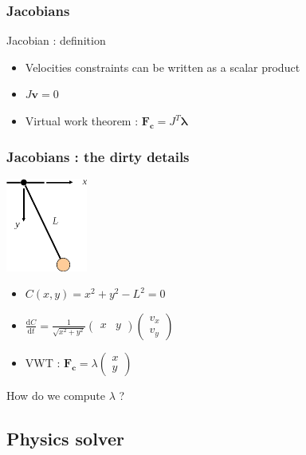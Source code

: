 \documentclass{beamer}
\begin{document}
\begin{frame}
 \frametitle{Jacobians}
 \begin{block}{Jacobian : definition}
 \begin{itemize}
  \item Velocities constraints can be written as a scalar product
  \item $J\mathbf{v} = 0$
  \pause
  \item Virtual work theorem : $\mathbf{F_c} = J^T \mathbf{\lambda}$
  \end{itemize}
  \end{block}
\end{frame}

\begin{frame}
 \frametitle{Jacobians : the dirty details}
  \begin{center}\includegraphics[width = 0.2\textwidth]{pendulum.png}\end{center}
  \begin{itemize}
    \item $C(x,y) = x^2 + y^2 - L^2 = 0$
    \pause
    \item $\frac{\mathrm{d}C}{\mathrm{d}t} = \frac{ 1 }{\sqrt{x^2+y^2}} \begin{pmatrix} x & y\end{pmatrix} \begin{pmatrix} v_x \\ v_y\end{pmatrix}$
    \pause
    \item VWT : $\mathbf{F_c} = \lambda \begin{pmatrix}x\\y\end{pmatrix}$ 
  \end{itemize}
  How do we compute $\lambda$ ?
\end{frame}

\subsection{Physics solver}
\end{document}
